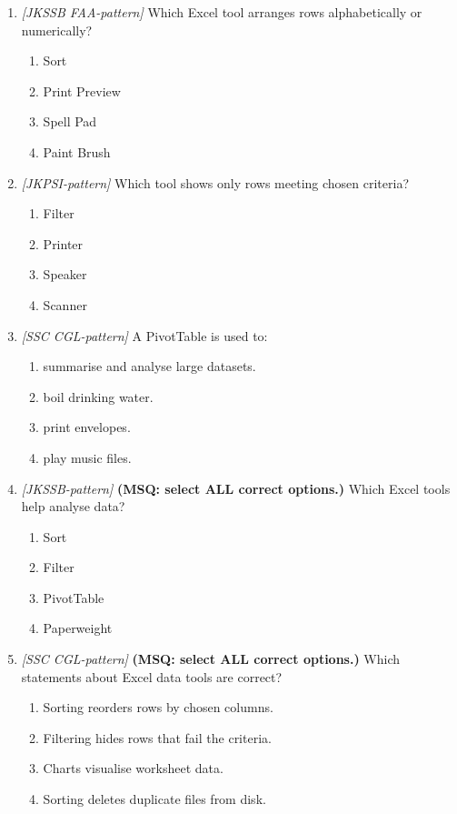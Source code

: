 \begin{enumerate}[label=\textbf{Q\arabic*.}, leftmargin=*]
\item \textit{[JKSSB FAA-pattern]} Which Excel tool arranges rows alphabetically or numerically?
  \begin{enumerate}[label=\Alph*.]
    \item Sort
    \item Print Preview
    \item Spell Pad
    \item Paint Brush
  \end{enumerate}
\item \textit{[JKPSI-pattern]} Which tool shows only rows meeting chosen criteria?
  \begin{enumerate}[label=\Alph*.]
    \item Filter
    \item Printer
    \item Speaker
    \item Scanner
  \end{enumerate}
\item \textit{[SSC CGL-pattern]} A PivotTable is used to:
  \begin{enumerate}[label=\Alph*.]
    \item summarise and analyse large datasets.
    \item boil drinking water.
    \item print envelopes.
    \item play music files.
  \end{enumerate}
\item \textit{[JKSSB-pattern]} \textbf{(MSQ: select ALL correct options.)} Which Excel tools help analyse data?
  \begin{enumerate}[label=\Alph*.]
    \item Sort
    \item Filter
    \item PivotTable
    \item Paperweight
  \end{enumerate}
\item \textit{[SSC CGL-pattern]} \textbf{(MSQ: select ALL correct options.)} Which statements about Excel data tools are correct?
  \begin{enumerate}[label=\Alph*.]
    \item Sorting reorders rows by chosen columns.
    \item Filtering hides rows that fail the criteria.
    \item Charts visualise worksheet data.
    \item Sorting deletes duplicate files from disk.

\end{enumerate}
\end{enumerate}

